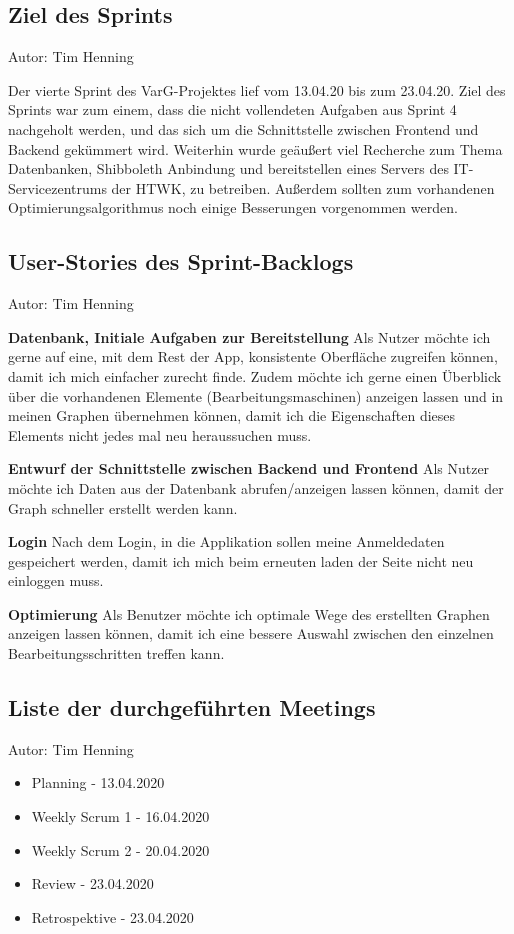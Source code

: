 \subsection{Ziel des Sprints}
{\small Autor: Tim Henning}

Der vierte Sprint des VarG-Projektes lief vom 13.04.20 bis zum 23.04.20.
Ziel des Sprints war zum einem, dass die nicht vollendeten Aufgaben aus Sprint 4 nachgeholt werden, und das sich um die Schnittstelle zwischen Frontend und Backend gekümmert wird. Weiterhin wurde geäußert viel Recherche zum Thema Datenbanken, Shibboleth Anbindung und bereitstellen eines Servers des IT-Servicezentrums der HTWK, zu betreiben. Außerdem sollten zum vorhandenen Optimierungsalgorithmus noch einige Besserungen vorgenommen werden.

\subsection{User-Stories des Sprint-Backlogs}
{\small Autor: Tim Henning}

\textbf{Datenbank, Initiale Aufgaben zur Bereitstellung}
Als Nutzer möchte ich gerne auf eine, mit dem Rest der App, konsistente Oberfläche zugreifen können, damit ich mich einfacher zurecht finde. Zudem möchte ich gerne einen Überblick über die vorhandenen Elemente (Bearbeitungsmaschinen) anzeigen lassen und in meinen Graphen übernehmen können, damit ich die Eigenschaften dieses Elements nicht jedes mal neu heraussuchen muss.

\textbf{Entwurf der Schnittstelle zwischen Backend und Frontend}
Als Nutzer möchte ich Daten aus der Datenbank abrufen/anzeigen lassen können, damit der Graph schneller erstellt werden kann.

\textbf{Login}
Nach dem Login, in die Applikation sollen meine Anmeldedaten gespeichert werden, damit ich mich beim erneuten laden der Seite nicht neu einloggen muss.

\textbf{Optimierung}
Als Benutzer möchte ich optimale Wege des erstellten Graphen anzeigen lassen können, damit ich eine bessere Auswahl zwischen den einzelnen Bearbeitungsschritten treffen kann.


\subsection{Liste der durchgeführten Meetings}
{\small Autor: Tim Henning}

\begin{itemize}
	\item Planning - 13.04.2020
	\item Weekly Scrum 1 - 16.04.2020
	\item Weekly Scrum 2 - 20.04.2020
	\item Review - 23.04.2020
	\item Retrospektive - 23.04.2020
\end{itemize}

